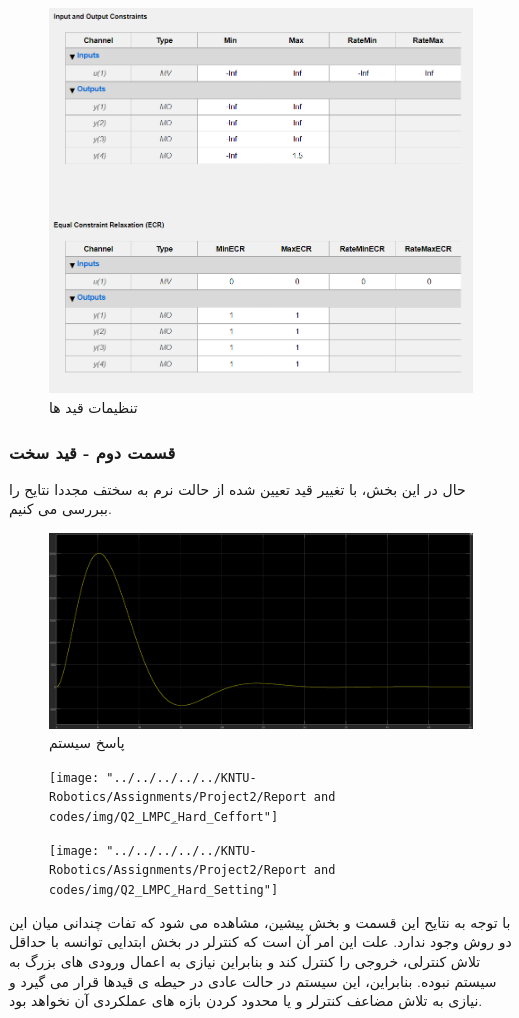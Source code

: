 \begin{figure}[H]
	\centering
	\includegraphics[width=0.7\linewidth]{../img/Q2_LMPC_ِsoft_setting1}
	\caption{تنظیمات قید ها}
	\label{fig:q2lmpcsoftsetting1}
\end{figure}
\subsubsection{قسمت دوم - قید سخت}
حال در این بخش، با تغییر قید تعیین شده از حالت نرم به سختف مجددا نتایح را ببررسی می کنیم.
\begin{figure}
	\centering
	\includegraphics[width=1\linewidth]{../img/Q2_LMPC_ِHard_Response}
	\caption{پاسخ سیستم}
	\label{fig:q2lmpchardresponse}
\end{figure}
\begin{figure}
	\centering
	\texttt{[image: "../../../../../KNTU-Robotics/Assignments/Project2/Report and codes/img/Q2\_LMPC\_ِHard\_Ceffort"]}
	\caption{}
	\label{fig:q2lmpchardceffort}
\end{figure}
\begin{figure}
	\centering
	\texttt{[image: "../../../../../KNTU-Robotics/Assignments/Project2/Report and codes/img/Q2\_LMPC\_ِHard\_Setting"]}
	\caption{}
	\label{fig:q2lmpchardsetting}
\end{figure}
با توجه به نتایح این قسمت و بخش پیشین، مشاهده می شود که تفات چندانی میان این دو روش وجود ندارد. علت این امر آن است که کنترلر در بخش ابتدایی توانسه با حداقل تلاش کنترلی، خروجی را کنترل کند و بنابراین نیازی به اعمال ورودی های بزرگ به سیستم نبوده. بنابراین، این سیستم در حالت عادی در حیطه ی قیدها قرار می گیرد و نیازی به تلاش مضاعف کنترلر و یا محدود کردن بازه های عملکردی آن نخواهد بود.
